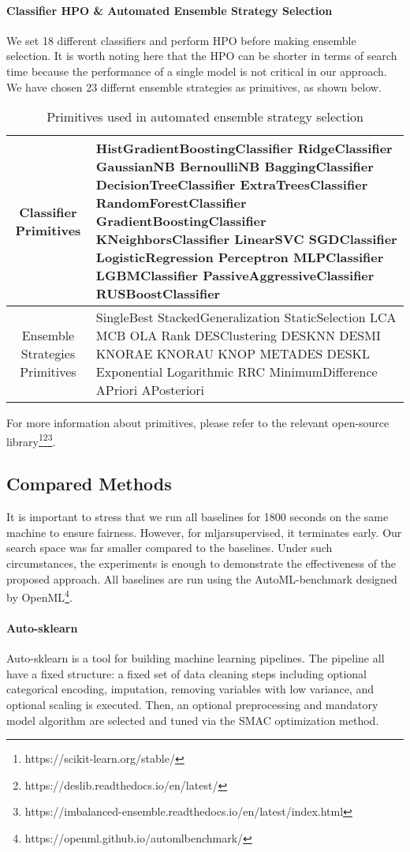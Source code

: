 \documentclass[review]{elsarticle}
\begin{document}
\paragraph{Classifier HPO \& Automated Ensemble Strategy Selection}
We set 18 different classifiers and perform HPO before making ensemble selection. It is worth noting here that the HPO can be shorter in terms of search time because the performance of a single model is not critical in our approach. We have chosen 23 differnt ensemble strategies as primitives, as shown below.
\begin{table}[htbp]
	\centering
	\caption{Primitives used in automated ensemble strategy selection}	
	\renewcommand\tabularxcolumn[1]{m{#1}}
	\begin{tabularx}{350pt}{|c|C|}
		\hline
		Classifier Primitives & HistGradientBoostingClassifier RidgeClassifier GaussianNB BernoulliNB BaggingClassifier DecisionTreeClassifier ExtraTreesClassifier RandomForestClassifier GradientBoostingClassifier KNeighborsClassifier LinearSVC SGDClassifier LogisticRegression Perceptron MLPClassifier LGBMClassifier PassiveAggressiveClassifier RUSBoostClassifier\\
		\hline
		Ensemble Strategies Primitives & SingleBest StackedGeneralization StaticSelection LCA MCB OLA Rank DESClustering DESKNN DESMI KNORAE KNORAU KNOP METADES DESKL Exponential Logarithmic RRC MinimumDifference APriori APosteriori \\
		\hline
	\end{tabularx}
\end{table}
For more information about primitives, please refer to the relevant open-source library\footnote{https://scikit-learn.org/stable/}\footnote{https://deslib.readthedocs.io/en/latest/}\footnote{https://imbalanced-ensemble.readthedocs.io/en/latest/index.html}.
\subsection{Compared Methods}
It is important to stress that we run all baselines for 1800 seconds on the same machine to ensure fairness. However, for mljarsupervised, it terminates early. Our search space was far smaller compared to the baselines. Under such circumstances, the experiments is enough to demonstrate the effectiveness of the proposed approach. All baselines are run using the AutoML-benchmark designed by OpenML\footnote{https://openml.github.io/automlbenchmark/}.
\paragraph{Auto-sklearn}
Auto-sklearn\cite{feurer2015efficient} is a tool for building machine learning pipelines. The pipeline all have a fixed structure: a fixed set of data cleaning steps including optional categorical encoding, imputation, removing variables with low variance, and optional scaling is executed. Then, an optional preprocessing and mandatory model algorithm are selected and tuned via the SMAC optimization method\cite{JMLR:v23:21-0888}.
\end{document}
